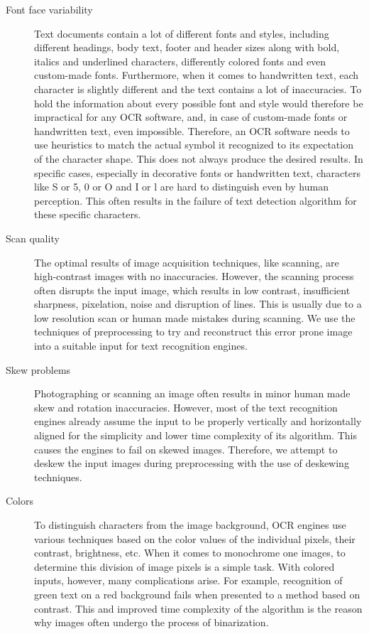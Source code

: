 \begin{description}

\item[Font face variability] Text documents contain a lot of different fonts and styles, including different headings, body text, footer and header sizes along with bold, italics and underlined characters, differently colored fonts and even custom-made fonts. Furthermore, when it comes to handwritten text, each character is slightly different and the text contains a lot of inaccuracies. To hold the information about every possible font and style would therefore be impractical for any OCR software, and, in case of custom-made fonts or handwritten text, even impossible. Therefore, an OCR software needs to use heuristics to match the actual symbol it recognized to its expectation of the character shape. This does not always produce the desired results. In specific cases, especially in decorative fonts or handwritten text, characters like S or 5, 0 or O and I or l are hard to distinguish even by human perception. This often results in the failure of text detection algorithm for these specific characters.

\item[Scan quality] The optimal results of image acquisition techniques, like scanning, are high-contrast images with no inaccuracies. However, the scanning process often disrupts the input image, which results in low contrast, insufficient sharpness, pixelation, noise and disruption of lines. This is usually due to a low resolution scan or human made mistakes during scanning. We use the techniques of preprocessing to try and reconstruct this error prone image into a suitable input for text recognition engines.

\item[Skew problems] Photographing or scanning an image often results in minor human made skew and rotation inaccuracies. However, most of the text recognition engines already assume the input to be properly vertically and horizontally aligned for the simplicity and lower time complexity of its algorithm. This causes the engines to fail on skewed images. Therefore, we attempt to deskew the input images during preprocessing with the use of deskewing techniques.

\item[Colors] To distinguish characters from the image background, OCR engines use various techniques based on the color values of the individual pixels, their contrast, brightness, etc. When it comes to monochrome one images, to determine this division of image pixels is a simple task. With colored inputs, however, many complications arise. For example, recognition of green text on a red background fails when presented to a method based on contrast. This and improved time complexity of the algorithm is the reason why images often undergo the process of binarization. 

\end{description}

